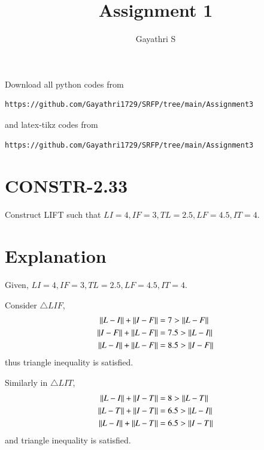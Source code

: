 \documentclass[journal,12pt,twocolumn]{IEEEtran}
\begin{document}
     \def\rightbox#1{\makebox[0in][r]{#1}}
     \def\centbox#1{\makebox[0in]{#1}}
     \def\topbox#1{\raisebox{-\baselineskip}[0in][0in]{#1}}
     \def\midbox#1{\raisebox{-0.5\baselineskip}[0in][0in]{#1}}
%
\title{Assignment 1} 
\author{Gayathri S}
\maketitle
\newpage
\bigskip
\renewcommand{\thefigure}{\theenumi}
\renewcommand{\thetable}{\theenumi}
Download all python codes from 
\begin{lstlisting}
https://github.com/Gayathri1729/SRFP/tree/main/Assignment3
\end{lstlisting}
%
and latex-tikz codes from 
%
\begin{lstlisting}
https://github.com/Gayathri1729/SRFP/tree/main/Assignment3
\end{lstlisting}
%
\section{CONSTR-2.33}
Construct LIFT such that $LI =4,IF =3,TL =2.5,LF =4.5,IT =4$.
\section{Explanation}
Given, $LI =4,IF =3,TL =2.5,LF =4.5,IT =4$.

Consider $\triangle LIF$,
\begin{align}
    \left\lVert L-I\right\rVert+\left\lVert I-F\right\rVert &=7 >\left\lVert L-F\right\rVert\\
    \left\lVert I-F\right\rVert+\left\lVert L-F\right\rVert &=7.5 >\left\lVert L-I\right\rVert\\
    \left\lVert L-I\right\rVert+\left\lVert L-F\right\rVert &=8.5 >\left\lVert I-F\right\rVert
\end{align}
thus triangle inequality is satisfied.

Similarly in $\triangle LIT$,
\begin{align}
    \left\lVert L-I\right\rVert+\left\lVert I-T\right\rVert &=8 >\left\lVert L-T\right\rVert\\
    \left\lVert L-T\right\rVert+\left\lVert I-T\right\rVert &=6.5 >\left\lVert L-I\right\rVert\\
    \left\lVert L-I\right\rVert+\left\lVert L-T\right\rVert &=6.5 >\left\lVert I-T\right\rVert
\end{align}
and triangle inequality is satisfied.
\end{document}
